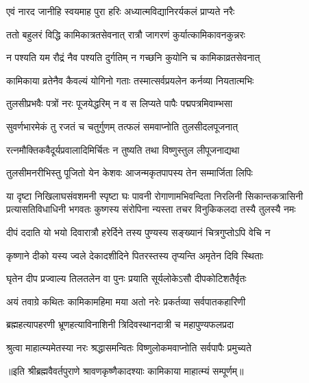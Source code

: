 \twolineshloka
{एवं नारद जानीहि स्वयमाह पुरा हरिः}
{अध्यात्मविद्यानिरर्यकलं प्राप्यते नरैः} %

\twolineshloka
{ततो बहुलरं विद्धि कामिकात्रतसेवनात्}
{रात्रौ जागरणं कुर्यात्कामिकावनकुन्नरः} %

\twolineshloka
{न पश्यति यम रौद्रं नैव पश्यति दुर्गतिम्}
{न गच्छनि कुयोनि च कामिकाव्रतसेवनात्} %

\twolineshloka
{कामिकाया व्रतेनैव कैवल्यं योगिनो गताः}
{तस्मात्सर्वप्रयलेन कर्नव्या नियतात्मभिः} %

\twolineshloka
{तुलसीप्रभवैः पत्रों नरः पूजयेद्धरिम्}
{न व स लिप्यते पापैः पद्मपत्रमिवाम्भसा} %

\twolineshloka
{सुवर्णभारमेकं तु रजतं च चतुर्गुणम्}
{तत्फलं समवाप्नोति तुलसीदलपूजनात्} %

\twolineshloka
{रत्नमौक्तिकवैदूर्यप्रवालादिमिर्चितः}
{न तुष्यति तथा विष्णुस्तुल लीपूजनाद्यथा} %

\twolineshloka
{तुलसीमनरीभिस्तु पूजितो येन केशवः}
{आजन्मकृतपापस्य तेन सम्मार्जिता लिपिः} %

\fourlineindentedshloka
{या दृष्टा निखिलाघसंवशमनी स्पृष्टा घः पावनी}
{रोगाणामभिवन्दिता निरलिनी सिकान्तकत्रासिनी}
{प्रत्यासतिविधाधिनी भगवतः कुष्गस्य संरोपिना}
{न्यस्ता तचर विनुकिकलदा तस्यै तुलस्यै नमः} %

\twolineshloka
{दीपं ददाति यो भयो दिवारात्रौ हरेर्दिने}
{तस्य पुण्यस्य सङ्ख्यानं चित्रगुप्तोऽपि वेचि न} %

\twolineshloka
{कृष्णाने दीको यस्य ज्वले देकादशीदिने}
{पितरस्तस्य तृप्यन्ति अमृतेन दिवि स्थिताः} %

\twolineshloka
{घृतेन दीप प्रज्वाल्य तिलतलेन वा पुनः}
{प्रयाति सूर्यलोकेऽसौ दीपकोटिशतैर्वृतः} %

\twolineshloka
{अयं तवाग्रे कथितः कामिकामहिमा मया}
{अतो नरेः प्रकर्तव्या सर्वपातकहारिणी} %

\twolineshloka
{ब्रह्महत्यापहरणी भ्रूणहत्याविनाशिनी}
{त्रिदिवस्थानदात्री च महापुण्यफलप्रदा} %

\twolineshloka
{श्रुत्वा माहात्म्यमेतस्या नरः श्रद्धासमन्वितः}
{विष्णुलोकमवाप्नोति सर्वपापैः प्रमुच्यते} %

॥इति श्रीब्रह्मवैवर्तपुराणे श्रावणकृष्णैकादश्याः कामिकाया माहात्म्यं सम्पूर्णम्॥


\hyperref[sec:ekadashi_mahatmyam_vrata_raja]{\closesub}
\clearpage

\label{sec:vrata-raja-shravana-shukla-putrada}


